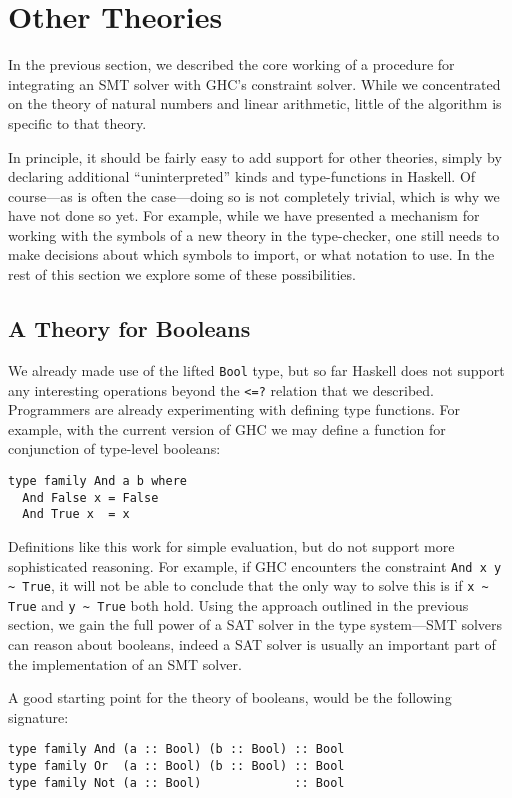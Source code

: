 \documentclass{sigplanconf}
\begin{document}
\section{Other Theories}
\label{other}

In the previous section, we described the core working of a procedure
for integrating an SMT solver with GHC's constraint solver.  While
we concentrated on the theory of natural numbers and linear arithmetic,
little of the algorithm is specific to that theory.

In principle, it should be fairly easy to add support for other theories,
simply by declaring additional ``uninterpreted'' kinds and type-functions
in Haskell.  Of course---as is often the case---doing so is not completely
trivial, which is why we have not done so yet.  For example, while we
have presented a mechanism for working with the symbols of a new theory
in the type-checker, one still needs to make decisions about which symbols
to import, or what notation to use.  In the rest of this section we
explore some of these possibilities.

\subsection{A Theory for Booleans}
We already made use of the lifted \Verb"Bool" type, but so far Haskell
does not support any interesting operations beyond the \Verb"<=?" relation
that we described.  Programmers are already experimenting with defining
type functions. For example, with the current version of GHC we may
define a function for conjunction of type-level booleans:
\begin{Verbatim}
type family And a b where
  And False x = False
  And True x  = x
\end{Verbatim}

Definitions like this work for simple evaluation, but do not support
more sophisticated reasoning.  For example, if GHC encounters
the constraint \Verb"And x y ~ True", it will not be able to conclude
that the only way to solve this is if \Verb"x ~ True" and \Verb"y ~ True"
both hold.  Using the approach outlined in the previous section, we
gain the full power of a SAT solver in the type system---SMT solvers
can reason about booleans, indeed a SAT solver is usually an important
part of the implementation of an SMT solver.

A good starting point for the theory of booleans, would be the following
signature:
\begin{Verbatim}
type family And (a :: Bool) (b :: Bool) :: Bool
type family Or  (a :: Bool) (b :: Bool) :: Bool
type family Not (a :: Bool)             :: Bool
\end{Verbatim}
\end{document}
